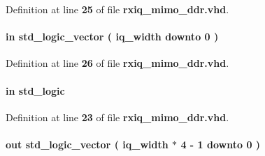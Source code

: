 Definition at line {\bf 25} of file {\bf rxiq\+\_\+mimo\+\_\+ddr.\+vhd}.

\paragraph[{D\+I\+Q\+\_\+l}]{ {\bfseries \textcolor{keywordflow}{in}\textcolor{vhdlchar}{ }} {\bfseries \textcolor{comment}{std\+\_\+logic\+\_\+vector}\textcolor{vhdlchar}{ }\textcolor{vhdlchar}{(}\textcolor{vhdlchar}{ }\textcolor{vhdlchar}{ }\textcolor{vhdlchar}{ }\textcolor{vhdlchar}{ }{\bfseries {\bf iq\+\_\+width}} \textcolor{vhdlchar}{ }\textcolor{keywordflow}{downto}\textcolor{vhdlchar}{ }\textcolor{vhdlchar}{ } \textcolor{vhdldigit}{0} \textcolor{vhdlchar}{ }\textcolor{vhdlchar}{)}\textcolor{vhdlchar}{ }} \hspace{0.3cm}{\ttfamily [Port]}}\label{classrxiq__mimo__ddr_afafc9ce167a5b56fc65593195ef61105}


Definition at line {\bf 26} of file {\bf rxiq\+\_\+mimo\+\_\+ddr.\+vhd}.

\paragraph[{fidm}]{ {\bfseries \textcolor{keywordflow}{in}\textcolor{vhdlchar}{ }} {\bfseries \textcolor{comment}{std\+\_\+logic}\textcolor{vhdlchar}{ }} \hspace{0.3cm}{\ttfamily [Port]}}\label{classrxiq__mimo__ddr_a97ae5ad9eee26d5f984f95d151f62ec0}


Definition at line {\bf 23} of file {\bf rxiq\+\_\+mimo\+\_\+ddr.\+vhd}.

\paragraph[{fifo\+\_\+wdata}]{ {\bfseries \textcolor{keywordflow}{out}\textcolor{vhdlchar}{ }} {\bfseries \textcolor{comment}{std\+\_\+logic\+\_\+vector}\textcolor{vhdlchar}{ }\textcolor{vhdlchar}{(}\textcolor{vhdlchar}{ }\textcolor{vhdlchar}{ }\textcolor{vhdlchar}{ }\textcolor{vhdlchar}{ }{\bfseries {\bf iq\+\_\+width}} \textcolor{vhdlchar}{$\ast$}\textcolor{vhdlchar}{ } \textcolor{vhdldigit}{4} \textcolor{vhdlchar}{-\/}\textcolor{vhdlchar}{ } \textcolor{vhdldigit}{1} \textcolor{vhdlchar}{ }\textcolor{keywordflow}{downto}\textcolor{vhdlchar}{ }\textcolor{vhdlchar}{ } \textcolor{vhdldigit}{0} \textcolor{vhdlchar}{ }\textcolor{vhdlchar}{)}\textcolor{vhdlchar}{ }} \hspace{0.3cm}{\ttfamily [Port]}}\label{classrxiq__mimo__ddr_a880b1371c4c1600fe490c979402d668f}


